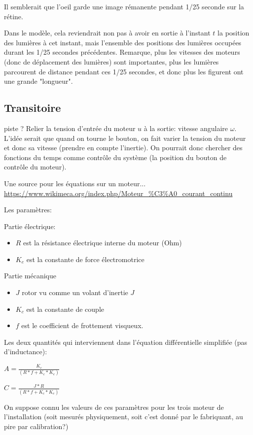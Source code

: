 \documentclass[11pt,a4paper]{article}
\begin{document}
Il semblerait que l’oeil garde une image rémanente pendant 1/25 seconde sur la rétine.

Dans le modèle, cela reviendrait non pas à avoir en sortie à l'instant $t$ la position des lumières à cet instant, mais l'ensemble des positions des lumières occupées durant les 1/25 secondes précédentes. Remarque, plus les vitesses des moteurs (donc de déplacement des lumières) sont importantes, plus les lumières parcourent de distance pendant ces 1/25 secondes, et donc plus les figurent ont une grande "longueur".


\subsection{Transitoire}

piste ? Relier la tension d'entrée du moteur $u$ à la sortie: vitesse angulaire $\omega$. L'idée serait que quand on tourne le bouton, on fait varier la tension du moteur et donc sa vitesse (prendre en compte l'inertie). On pourrait donc chercher des fonctions du temps comme contrôle du système (la position du bouton de contrôle du moteur).

Une source pour les équations sur un moteur...
\url{https://www.wikimeca.org/index.php/Moteur_\%C3\%A0_courant_continu}

Les paramètres:

Partie électrique:
\begin{itemize}
\item $R$ est la résistance électrique interne du moteur (Ohm)
\item  $K_e$ est la constante de force électromotrice
\end{itemize}


Partie mécanique
\begin{itemize}
\item $J$  rotor vu comme un volant d'inertie $J$  
\item $K_c$ est la constante de couple  
\item $f$ est le coefficient de frottement visqueux.
\end{itemize}


Les deux quantités qui interviennent dans l'équation différentielle simplifiée (pas d'inductance):

$A =  \frac{K_c}{(R*f+K_c*K_e)}$

$C = \frac{J*R}{(R*f+K_c*K_e)}$


On suppose connu les valeurs de ces paramètres pour les trois moteur de l'installation (soit mesurés physiquement, soit c'est donné par le fabriquant, au pire par calibration?)
\end{document}
